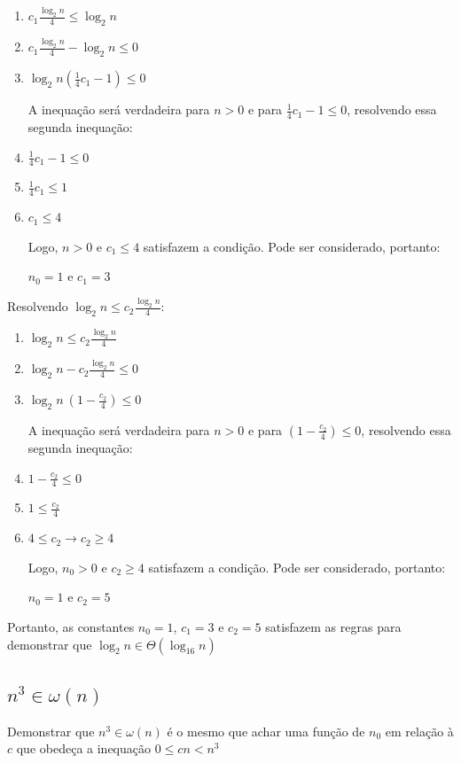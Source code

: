 \documentclass[ a4paper, twocolumn]{article}
\theoremstyle{definition}
\begin{document}
\begin{enumerate}[Step 1:]
	\item   $c_1 \frac{\log_{2}n}{4} \leq \log_2n$
	\item   $c_1 \frac{\log_{2}n}{4} - \log_2n \leq 0$
	\item   $\log_{2}n (\frac{1}{4}c_1 - 1) \leq 0$
	
	A inequação será verdadeira para $n > 0$ e para $\frac{1}{4}c_1 - 1 \leq 0$, resolvendo essa segunda inequação:
	
	\item $\frac{1}{4}c_1 - 1 \leq 0$
	\item $\frac{1}{4}c_1 \leq 1$
	\item $c_1 \leq 4$
	
	Logo, $n > 0$ e $c_1 \leq 4$ satisfazem a condição. Pode ser considerado, portanto:
	
	$n_0 = 1$ e $c_1 = 3$
\end{enumerate}

Resolvendo $\log_2n \leq c_2\frac{\log_{2}n}{4}$:
\begin{enumerate}[Step 1:]
	\item   $\log_2n \leq c_2\frac{\log_{2}n}{4}$
	\item   $\log_2n - c_2\frac{\log_{2}n}{4} \leq 0$
	\item   $\log_2n \ (1 - \frac{c_2}{4}) \leq 0$
	
	A inequação será verdadeira para $n > 0$ e para $(1 - \frac{c_2}{4}) \leq 0$, resolvendo essa segunda inequação:
	
	\item $1 - \frac{c_2}{4} \leq 0$
	\item $1 \leq \frac{c_2}{4}$
	\item $4 \leq c_2 \rightarrow c_2 \geq 4$
	
	Logo, $n_0 > 0$ e $c_2 \geq 4$ satisfazem a condição. Pode ser considerado, portanto:
	
	$n_0 = 1$ e $c_2 = 5$
\end{enumerate}

Portanto, as constantes $n_0 = 1$, $c_1 = 3$ e $c_2 = 5$ satisfazem as regras para demonstrar que $\log_2n \in \Theta(\log_{16}n)$

\subsection{$n^3 \in \omega(n)$}
Demonstrar que $n^3 \in \omega(n)$ é o mesmo que achar uma função de $n_0$ em relação à $c$ que obedeça a inequação $0 \leq cn < n^3$
\end{document}
